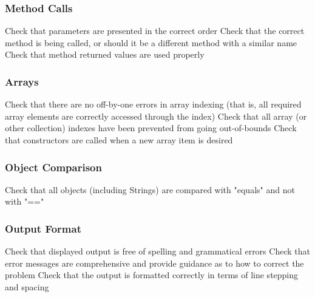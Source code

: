\subsubsection{Method Calls}
\begin{itemize}
		Check that parameters are presented in the correct order
		Check that the correct method is being called, or should it be a different method with a similar name
		Check that method returned values are used properly
\end{itemize}
%
\subsubsection{Arrays}
\begin{itemize}
		Check that there are no off-by-one errors in array indexing (that is, all required array elements are correctly accessed through the index)
		Check that all array (or other collection) indexes have been prevented from going out-of-bounds
		Check that constructors are called when a new array item is desired
\end{itemize}
%
\subsubsection{Object Comparison}
\begin{itemize}
		Check that all objects (including Strings) are compared with "equals" and not with "=="
\end{itemize}
%
\subsubsection{Output Format}
\begin{itemize}
		Check that displayed output is free of spelling and grammatical errors
		Check that error messages are comprehensive and provide guidance as to how to correct the problem
		Check that the output is formatted correctly in terms of line stepping and spacing
\end{itemize}
%
